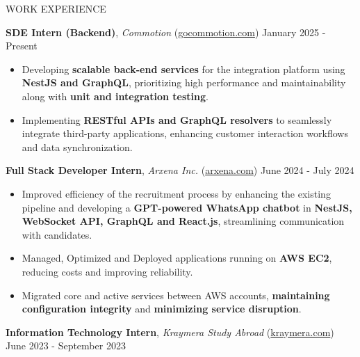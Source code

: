 \documentclass{resume} %
\begin{document}
\begin{rSection}{WORK EXPERIENCE}

    \textbf{SDE Intern (Backend)}, \textit{Commotion} (\href{https://gocommotion.com}{gocommotion.com})  \hfill January 2025 - Present

    \begin{itemize}
        \itemsep -6pt {}
            \item Developing \textbf{scalable back-end services} for the integration platform using \textbf{NestJS and GraphQL}, prioritizing high performance and maintainability along with \textbf{unit and integration testing}.
            \item Implementing \textbf{RESTful APIs and GraphQL resolvers} to seamlessly integrate third-party applications, enhancing customer interaction workflows and data synchronization.
    \end{itemize}

    \textbf{Full Stack Developer Intern}, \textit{Arxena Inc.} (\href{https://arxena.com}{arxena.com})  \hfill June 2024 - July 2024

    \begin{itemize}
        \itemsep -6pt {}
        \item Improved efficiency of the recruitment process by enhancing the existing
              pipeline and developing a \textbf{GPT-powered WhatsApp chatbot} in
              \textbf{NestJS, WebSocket API, GraphQL and React.js}, streamlining
              communication with candidates.
        \item  Managed, Optimized and Deployed applications running on \textbf{AWS EC2},
              reducing costs and improving reliability.
              \item Migrated core and active services between AWS accounts, \textbf{maintaining configuration integrity} and \textbf{minimizing service disruption}.
    \end{itemize}

    \textbf{Information Technology Intern}, \textit{Kraymera Study Abroad} (\href{https://kraymera.com}{kraymera.com})  \hfill June 2023 - September 2023

    \begin{itemize}
        \itemsep -6pt {}
        

\end{itemize}
\end{rSection}
\end{document}
